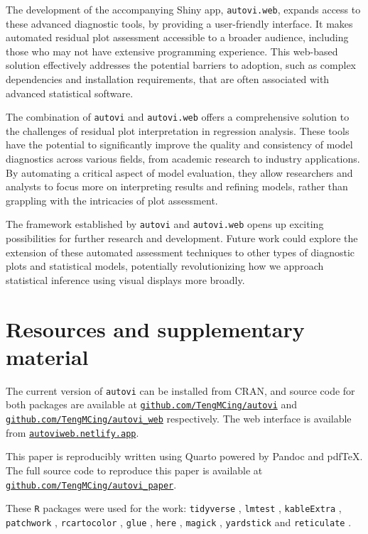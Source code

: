 \documentclass[
doublespace,
  times]{anzsauth}
\begin{document}
The development of the accompanying Shiny app, \texttt{autovi.web},
expands access to these advanced diagnostic tools, by providing a
user-friendly interface. It makes automated residual plot assessment
accessible to a broader audience, including those who may not have
extensive programming experience. This web-based solution effectively
addresses the potential barriers to adoption, such as complex
dependencies and installation requirements, that are often associated
with advanced statistical software.

The combination of \texttt{autovi} and \texttt{autovi.web} offers a
comprehensive solution to the challenges of residual plot interpretation
in regression analysis. These tools have the potential to significantly
improve the quality and consistency of model diagnostics across various
fields, from academic research to industry applications. By automating a
critical aspect of model evaluation, they allow researchers and analysts
to focus more on interpreting results and refining models, rather than
grappling with the intricacies of plot assessment.

The framework established by \texttt{autovi} and \texttt{autovi.web}
opens up exciting possibilities for further research and development.
Future work could explore the extension of these automated assessment
techniques to other types of diagnostic plots and statistical models,
potentially revolutionizing how we approach statistical inference using
visual displays more broadly.

\section{Resources and supplementary
material}\label{resources-and-supplementary-material}

The current version of \texttt{autovi} can be installed from CRAN, and
source code for both packages are available at
\href{https://github.com/TengMCing/autovi}{\texttt{github.com/TengMCing/autovi}}
and
\href{https://github.com/TengMCing/autovi_web}{\texttt{github.com/TengMCing/autovi\_web}}
respectively. The web interface is available from
\href{https://autoviweb.netlify.app/}{\texttt{autoviweb.netlify.app}}.

This paper is reproducibly written using Quarto
\citep{Allaire_Quarto_2024} powered by Pandoc \citep{MacFarlane_Pandoc}
and pdfTeX. The full source code to reproduce this paper is available at
\href{https://github.com/TengMCing/autovi_paper}{\texttt{github.com/TengMCing/autovi\_paper}}.

These \texttt{R} packages were used for the work: \texttt{tidyverse}
\citep{tidyverse}, \texttt{lmtest} \citep{lmtest}, \texttt{kableExtra}
\citep{kableextra}, \texttt{patchwork} \citep{patchwork},
\texttt{rcartocolor} \citep{rcartocolor}, \texttt{glue} \citep{glue},
\texttt{here} \citep{here}, \texttt{magick} \citep{magick},
\texttt{yardstick} \citep{yardstick} and \texttt{reticulate}
\citep{reticulate}.


  
\end{document}
